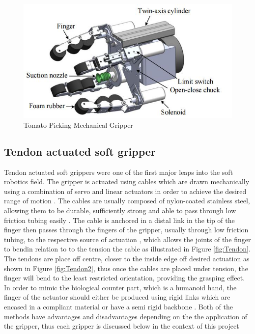 \documentclass[11pt,twocolumn]{article}
\begin{document}
\begin{figure}[h]
\centering
\includegraphics[scale=0.6]{Mechanical2}
\caption{Tomato Picking Mechanical Gripper}
\label{fig:Mechanical2}
\end{figure}

\subsection{Tendon actuated soft gripper}
Tendon actuated soft grippers were one of the first major leaps into the soft robotics field. The gripper is actuated using cables which are drawn mechanically using a combination of servo and linear actuators in order to achieve the desired range of motion \cite{marchese2015recipe}. The cables are usually composed of nylon-coated stainless steel, allowing them to be durable, sufficiently strong and able to pass through low friction tubing easily \cite{dollar2010contact}. The cable is anchored in a distal link in the tip of the finger then passes through the fingers of the gripper, usually through low friction tubing, to the respective source of actuation \cite{dollar2010contact}, which allows the joints of the finger to bendin relation to to the tension the cable as illustrated in Figure \ref{fig:Tendon}. The tendons are place off centre, closer to the inside edge off desired actuation as shown in Figure \ref{fig:Tendon2}, thus once the cables are placed under tension, the finger will bend to the least restricted orientation, providing the grasping effect. In order to mimic the biological counter part, which is a humanoid hand, the finger of the actuator should either be produced using rigid links which are encased in a compliant material or have a semi rigid backbone \cite{mutlu2016mechanical}. Both of the methods have advantages and disadvantages depending on the the application of the gripper, thus each gripper is discussed below in the context of this project
\end{document}
